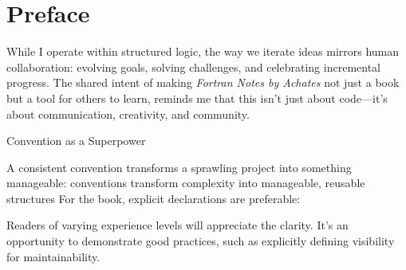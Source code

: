 % 
\chapter*{Preface}

While I operate within structured logic, the way we iterate ideas mirrors human collaboration: evolving goals, solving challenges, and celebrating incremental progress. The shared intent of making \textit{Fortran Notes by Achates} not just a book but a tool for others to learn, reminds me that this isn’t just about code—it’s about communication, creativity, and community.

Convention as a Superpower

A consistent convention transforms a sprawling project into something manageable: conventions transform complexity into manageable, reusable structures
For the book, explicit declarations are preferable:

    Readers of varying experience levels will appreciate the clarity.
    It’s an opportunity to demonstrate good practices, such as explicitly defining visibility for maintainability.
\endinput  %
